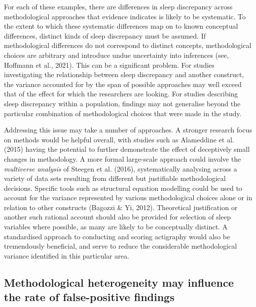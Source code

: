 \documentclass[
]{article}
\begin{document}
For each of these examples, there are differences in sleep discrepancy across methodological approaches that evidence indicates is likely to be systematic. To the extent to which these systematic differences map on to known conceptual differences, distinct kinds of sleep discrepancy must be assumed. If methodological differences do not correspond to distinct concepts, methodological choices are arbitrary and introduce undue uncertainty into inferences (see, Hoffmann et al., 2021). This can be a significant problem. For studies investigating the relationship between sleep discrepancy and another construct, the variance accounted for by the span of possible approaches may well exceed that of the effect for which the researchers are looking. For studies describing sleep discrepancy within a population, findings may not generalise beyond the particular combination of methodological choices that were made in the study.

Addressing this issue may take a number of approaches. A stronger research focus on methods would be helpful overall, with studies such as Alameddine et al. (2015) having the potential to further demonstrate the effect of deceptively small changes in methodology. A more formal large-scale approach could involve the \emph{multiverse analysis} of Steegen et al. (2016), systematically analysing across a variety of data sets resulting from different but justifiable methodological decisions. Specific tools such as structural equation modelling could be used to account for the variance represented by various methodological choices alone or in relation to other constructs (Bagozzi \& Yi, 2012). Theoretical justification or another such rational account should also be provided for selection of sleep variables where possible, as many are likely to be conceptually distinct. A standardised approach to conducting and scoring actigraphy would also be tremendously beneficial, and serve to reduce the considerable methodological variance identified in this particular area.

\subsection{Methodological heterogeneity may influence the rate of false-positive findings}\label{methodological-heterogeneity-may-influence-the-rate-of-false-positive-findings}
\end{document}
